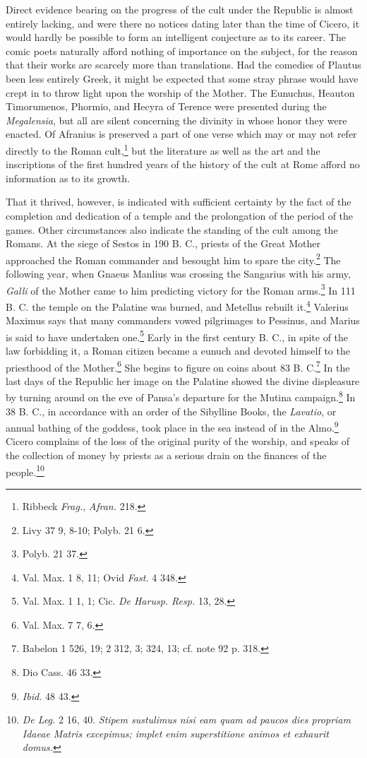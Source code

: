 \documentclass[a4paper, 11pt, oneside, polutonikogreek, english]{article}
\begin{document}
Direct evidence bearing on the progress of the cult under the Republic is almost entirely lacking, and were there no notices dating later than the time of Cicero, it would hardly be possible to form an intelligent conjecture as to its career. The comic poets naturally afford nothing of importance on the subject, for the reason that their works are scarcely more than translations. Had the comedies of Plautus been less entirely Greek, it might be expected that some stray phrase would have crept in to throw light upon the worship of the Mother. The Eunuchus, Heauton Timorumenos, Phormio, and Hecyra of Terence were presented during the \emph{Megalensia}, but all are silent concerning the divinity in whose honor they were enacted. Of Afranius is preserved a part of one verse which may or may not refer directly to the Roman cult,\footnote{Ribbeck \emph{Frag.}, \emph{Afran.} 218.} but the literature as well as the art and the inscriptions of the first hundred years of the history of the cult at Rome afford no information as to its growth.

That it thrived, however, is indicated with sufficient certainty by the fact of the completion and dedication of a temple and the prolongation of the period of the games. Other circumstances also indicate the standing of the cult among the Romans. At the siege of Sestos in 190 B. C., priests of the Great Mother approached the Roman commander and besought him to spare the city.\footnote{Livy 37 9, 8-10; Polyb. 21 6.} The following year, when Gnaeus Manlius was crossing the Sangarius with his army, \emph{Galli} of the Mother came to him predicting victory for the Roman arms.\footnote{Polyb. 21 37.} In 111 B. C. the temple on the Palatine was burned, and Metellus rebuilt it.\footnote{Val. Max. 1 8, 11; Ovid \emph{Fast.} 4 348.} Valerius Maximus says that many commanders vowed pilgrimages to Pessinus, and Marius is said to have undertaken one.\footnote{Val. Max. 1 1, 1; Cic. \emph{De Harusp. Resp.} 13, 28.} Early in the first century B. C., in spite of the law forbidding it, a Roman citizen became a eunuch and devoted himself to the priesthood of the Mother.\footnote{Val. Max. 7 7, 6.} She begins to figure on coins about 83 B. C.\footnote{Babelon 1 526, 19; 2 312, 3; 324, 13; cf. note 92 p. 318.} In the last days of the Republic her image on the Palatine showed the divine displeasure by turning around on the eve of Pansa's departure for the Mutina campaign.\footnote{Dio Cass. 46 33.} In 38 B. C., in accordance with an order of the Sibylline Books, the \emph{Lavatio}, or annual bathing of the goddess, took place in the sea instead of in the Almo.\footnote{\emph{Ibid.} 48 43.} Cicero complains of the loss of the original purity of the worship, and speaks of the collection of money by priests as a serious drain on the finances of the people.\footnote{\emph{De Leg.} 2 16, 40. \emph{Stipem sustulimus nisi eam quam ad paucos dies propriam Idaeae Matris excepimus; implet enim superstitione animos et exhaurit domus.}}
\end{document}
